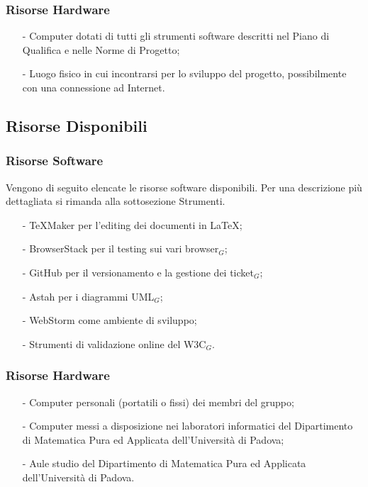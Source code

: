 \subsubsection{Risorse Hardware}
\begin{itemize}
	\item[-] Computer dotati di tutti gli strumenti software descritti nel Piano di Qualifica e nelle Norme di Progetto;
	\item[-] Luogo fisico in cui incontrarsi per lo sviluppo del progetto, possibilmente con una connessione ad Internet.
\end{itemize}

\subsection{Risorse Disponibili}
\subsubsection{Risorse Software}
Vengono di seguito elencate le risorse software disponibili. Per una descrizione più dettagliata si rimanda alla sottosezione Strumenti.
\begin{itemize}
	\item[-] TeXMaker per l'editing dei documenti in \LaTeX;
	\item[-] BrowserStack per il testing sui vari browser$_G$;
	\item[-] GitHub per il versionamento e la gestione dei ticket$_G$;
	\item[-] Astah per i diagrammi UML$_G$;
	\item[-] WebStorm come ambiente di sviluppo;
	\item[-] Strumenti di validazione online del W3C$_G$.
\end{itemize}

\subsubsection{Risorse Hardware}
\begin{itemize}
	\item[-] Computer personali (portatili o fissi) dei membri del gruppo; 
	\item[-] Computer messi a disposizione nei laboratori informatici del Dipartimento di Matematica Pura ed Applicata dell'Università di Padova;
	\item[-] Aule studio del Dipartimento di Matematica Pura ed Applicata
	dell'Università di Padova. 
\end{itemize}